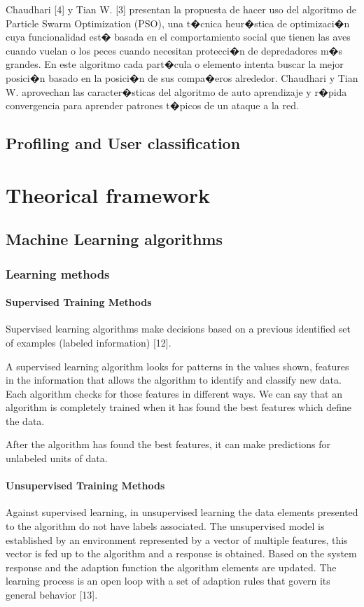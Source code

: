 \documentclass{article}
\begin{document}
Chaudhari  [4] y Tian W. [3] presentan la propuesta de hacer uso del algoritmo de Particle Swarm Optimization (PSO), una t�cnica heur�stica de optimizaci�n cuya funcionalidad est� basada en el comportamiento social que tienen las aves cuando vuelan o los peces cuando necesitan protecci�n de depredadores m�s grandes. En este algoritmo cada part�cula o elemento intenta buscar la mejor posici�n basado en la posici�n de sus compa�eros alrededor. Chaudhari y Tian W. aprovechan las caracter�sticas del algoritmo de auto aprendizaje y r�pida convergencia para aprender patrones t�picos de un ataque a la red. 



\subsection{Profiling  and User classification} %

\section{Theorical framework} %

\subsection{Machine Learning algorithms}	 %


\subsubsection{Learning methods} %

\paragraph{Supervised Training Methods} %
Supervised learning algorithms make decisions based on a previous identified set of examples (labeled information) [12].

A supervised learning algorithm looks for patterns in the values shown, features in the information that allows the algorithm to identify and classify new data. Each algorithm checks for those features in different ways. We can say that an algorithm is completely trained when it has found the best features which define the data.

After the algorithm has found the best features, it can make predictions for unlabeled units of data.


\paragraph{Unsupervised Training Methods} %
Against supervised learning, in unsupervised learning the data elements presented to the algorithm do not have labels associated. The unsupervised model is established by an environment represented by a vector of multiple features, this vector is fed up to the algorithm and a response is obtained. Based on the system response and the adaption function the algorithm elements are updated. The learning process is an open loop with a set of adaption rules that govern its general behavior [13].
\end{document}
